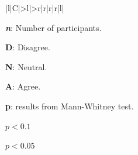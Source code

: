 \begin{table}[H]
\begin{threeparttable}[t]
\begin{tabularx}{\textwidth}{|l|C|>{\scriptsize}l|>{\scriptsize}r|r|r|r|l|}
\end{tabularx}
\begin{tablenotes}
    \scriptsize
     \item[] \textbf{\textit{n}}: Number of participants.
     \item[] \textbf{D}: Disagree.
     \item[] \textbf{N}: Neutral.
     \item[] \textbf{A}: Agree.
     \item[] \textbf{p}: results from Mann-Whitney test. \\
     \item[*] $p < 0.1$ 
     \item[**] $p < 0.05$ 
   \end{tablenotes}
   \end{threeparttable}
\caption[The most noticeable differences in motivation for the two sample groups.]{The most noticeable differences in motivation for the two sample groups. Full table in Appendix \ref{appendix:statistics}.}
\end{table}




